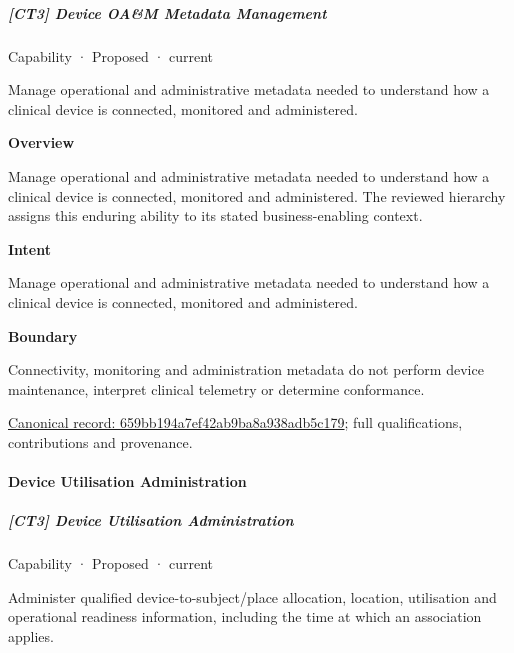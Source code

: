 \subparagraph{[CT3] Device OA\&M Metadata Management}

\label{element:659bb194a7ef42ab9ba8a938adb5c179}
{\small Capability · Proposed · current}\par

Manage operational and administrative metadata needed to understand how a clinical device is connected, monitored and administered.



\textbf{Overview}



Manage operational and administrative metadata needed to understand how a clinical device is connected, monitored and administered. The reviewed hierarchy assigns this enduring ability to its stated business-enabling context.



\textbf{Intent}



Manage operational and administrative metadata needed to understand how a clinical device is connected, monitored and administered.



\textbf{Boundary}



Connectivity, monitoring and administration metadata do not perform device maintenance, interpret clinical telemetry or determine conformance.


{\footnotesize \href{../../../../continuum/strategy/capability/659bb194a7ef42ab9ba8a938adb5c179.md}{Canonical record: 659bb194a7ef42ab9ba8a938adb5c179}; full qualifications, contributions and provenance.}\par
\paragraph{Device Utilisation Administration}

\subparagraph{[CT3] Device Utilisation Administration}

\label{element:1a3732b5911c45b3aece38b2db2d0f15}
{\small Capability · Proposed · current}\par

Administer qualified device-to-subject/place allocation, location, utilisation and operational readiness information, including the time at which an association applies.



